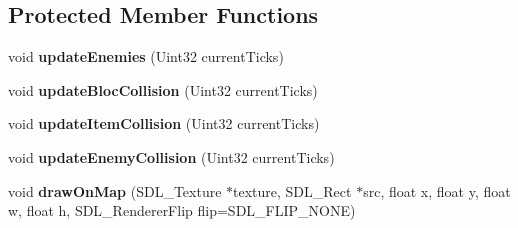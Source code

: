 \subsection*{Protected Member Functions}
\begin{DoxyCompactItemize}
\item 
\mbox{\label{class_play_level_ad94ef77757683662680029738169f067}} 
void {\bfseries update\+Enemies} (Uint32 current\+Ticks)
\item 
\mbox{\label{class_play_level_ab8e09e96d7c6f8bbd101ae6948c1c5c6}} 
void {\bfseries update\+Bloc\+Collision} (Uint32 current\+Ticks)
\item 
\mbox{\label{class_play_level_af1c6cf8482ee22ce3edc1270125895a3}} 
void {\bfseries update\+Item\+Collision} (Uint32 current\+Ticks)
\item 
\mbox{\label{class_play_level_a64397d62dd6230a5ec98cc229264a57d}} 
void {\bfseries update\+Enemy\+Collision} (Uint32 current\+Ticks)
\item 
\mbox{\label{class_play_level_a6820c1f5b0a59f2d757cc6242f82828e}} 
void {\bfseries draw\+On\+Map} (S\+D\+L\+\_\+\+Texture $\ast$texture, S\+D\+L\+\_\+\+Rect $\ast$src, float x, float y, float w, float h, S\+D\+L\+\_\+\+Renderer\+Flip flip=S\+D\+L\+\_\+\+F\+L\+I\+P\+\_\+\+N\+O\+NE)
\end{DoxyCompactItemize}
